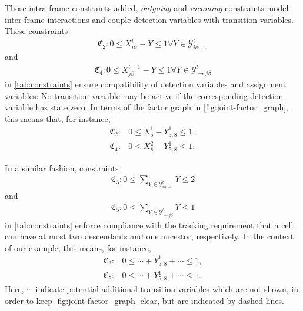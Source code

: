 Those intra-frame constraints added, \emph{outgoing} and \emph{incoming} constraints model inter-frame interactions
and couple detection variables with transition variables.
These constraints
\begin{align}
    \mathfrak{C}_2 : 0 \le X_{i\alpha}^t - Y \le 1 \forall Y \in \mathcal{Y}_{i\alpha\rightarrow}^t
\end{align}
and
\begin{align}
    \mathfrak{C}_4 : 0 \le X_{j\beta}^{t+1} - Y \le 1\forall Y \in \mathcal{Y}_{\rightarrow
        j\beta}^t
\end{align}
in \cref{tab:constraints} ensure compatibility of detection variables and assignment variables: No
transition variable may be active if the corresponding detection variable has state zero.  In terms
of the factor graph in \cref{fig:joint-factor_graph}, this means that, for instance,
\begin{align}
    \mathfrak{C}_2: &0 \le X_5^1 - Y_{5,8}^1 \le 1, \\
    \mathfrak{C}_4: &0 \le X_8^2 - Y_{5,8}^1 \le 1.
\end{align}


In a similar fashion, constraints
\begin{align}
    \mathfrak{C}_3 : 0 \le \sum_{Y\in\mathcal{Y}_{i\alpha\rightarrow}^t}Y \le 2
\end{align}
and
\begin{align}
    \mathfrak{C}_5 : 0\le\sum_{Y\in\mathcal{Y}_{\rightarrow j\beta}^t}Y \le 1
\end{align}
in \cref{tab:constraints} enforce compliance with the tracking requirement that a cell can have at
most two descendants and one ancestor, respectively. In the context of our example, this means, for
instance,
\begin{align}
    \mathfrak{C}_3 : & 0 \le \cdots + Y_{5,8}^1 + \cdots \le 1, \\
    \mathfrak{C}_5 : & 0 \le \cdots + Y_{5,8}^1 + \cdots \le 1.
\end{align}
Here, $\cdots$ indicate potential additional transition variables which are not shown, in order to
keep \cref{fig:joint-factor_graph} clear, but are indicated by dashed lines.

